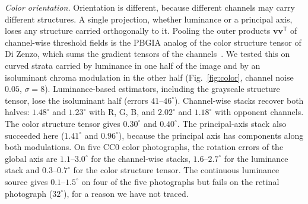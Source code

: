 \documentclass[11pt,a4paper]{article}
\newcommand{\vv}{\bm v}
\begin{document}
\emph{Color orientation.} Orientation is different, because different channels may carry different structures. A single projection, whether luminance or a principal axis, loses any structure carried orthogonally to it. Pooling the outer products $\vv\vv^{\mathsf T}$ of channel-wise threshold fields is the PBGIA analog of the color structure tensor of Di Zenzo, which sums the gradient tensors of the channels~\cite{DiZenzo1986}. We tested this on curved strata carried by luminance in one half of the image and by an isoluminant chroma modulation in the other half (Fig.~\ref{fig:color}, channel noise $0.05$, $\sigma=8$). Luminance-based estimators, including the grayscale structure tensor, lose the isoluminant half (errors $41$--$46^\circ$). Channel-wise stacks recover both halves: $1.48^\circ$ and $1.23^\circ$ with R, G, B, and $2.02^\circ$ and $1.18^\circ$ with opponent channels. The color structure tensor gives $0.30^\circ$ and $0.40^\circ$. The principal-axis stack also succeeded here ($1.41^\circ$ and $0.96^\circ$), because the principal axis has components along both modulations. On five CC0 color photographs, the rotation errors of the global axis are $1.1$--$3.0^\circ$ for the channel-wise stacks, $1.6$--$2.7^\circ$ for the luminance stack and $0.3$--$0.7^\circ$ for the color structure tensor. The continuous luminance source gives $0.1$--$1.5^\circ$ on four of the five photographs but fails on the retinal photograph ($32^\circ$), for a reason we have not traced.
\end{document}
